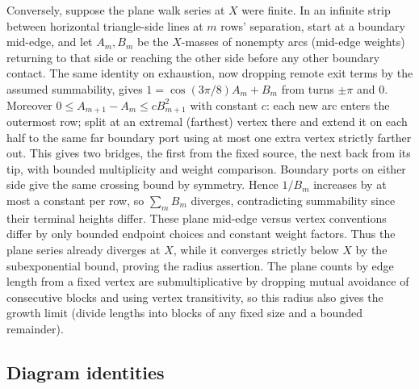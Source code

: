 \begin{remark}
Conversely, suppose the plane walk series at \(X\) were finite. In an infinite strip between horizontal triangle-side lines at \(m\) rows' separation, start at a boundary mid-edge, and let \(A_m,B_m\) be the \(X\)-masses of nonempty arcs (mid-edge weights) returning to that side or reaching the other side before any other boundary contact. The same identity on exhaustion, now dropping remote exit terms by the assumed summability, gives \(1=\cos(3\pi/8)A_m+B_m\) from turns \(\pm\pi\) and 0. Moreover \(0\le A_{m+1}-A_m\le c B_{m+1}^2\) with constant \(c\): each new arc enters the outermost row; split at an extremal (farthest) vertex there and extend it on each half to the same far boundary port using at most one extra vertex strictly farther out. This gives two bridges, the first from the fixed source, the next back from its tip, with bounded multiplicity and weight comparison. Boundary ports on either side give the same crossing bound by symmetry. Hence \(1/B_m\) increases by at most a constant per row, so \(\sum_m B_m\) diverges, contradicting summability since their terminal heights differ. These plane mid-edge versus vertex conventions differ by only bounded endpoint choices and constant weight factors. Thus the plane series already diverges at \(X\), while it converges strictly below \(X\) by the subexponential bound, proving the radius assertion. The plane counts by edge length from a fixed vertex are submultiplicative by dropping mutual avoidance of consecutive blocks and using vertex transitivity, so this radius also gives the growth limit (divide lengths into blocks of any fixed size and a bounded remainder).

\end{remark}

\subsection{Diagram identities}\label{L:step1}

